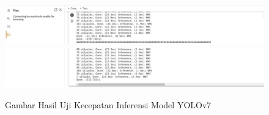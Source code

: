 \begin{figure}[H]
	\vspace{-0.1cm}
	\begin{center}
		\includegraphics[width=0.9\columnwidth]{lampiran/Picture6.jpg}
	\end{center}
	\begin{center}
		\includegraphics[width=0.9\columnwidth]{lampiran/Picture7.jpg}
	\end{center}
	\vspace{-0.2cm}
	\captionsetup{justification=centering}
	Gambar Hasil Uji Kecepatan Inferensi Model YOLOv7
\end{figure}
